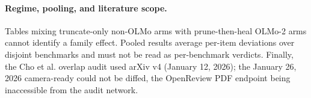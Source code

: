 \paragraph{Regime, pooling, and literature scope.}
Tables mixing truncate-only non-OLMo arms with prune-then-heal OLMo-2 arms cannot identify a family effect. Pooled results average per-item deviations over disjoint benchmarks and must not be read as per-benchmark verdicts. Finally, the Cho et al. overlap audit used arXiv v4 (January 12, 2026); the January 26, 2026 camera-ready could not be diffed, the OpenReview PDF endpoint being inaccessible from the audit network.
